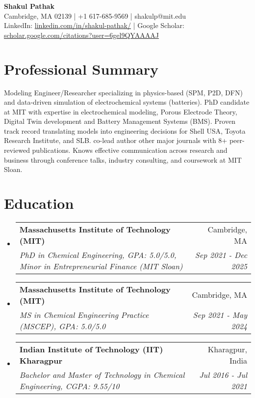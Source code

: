\documentclass[letterpaper,11pt]{article}
\makeatletter
\newcommand{\resumeSubheading}[4]{
  \vspace{-1pt}\item
    \begin{tabular*}{0.97\textwidth}{l@{\extracolsep{\fill}}r}
      \textbf{#1} & #2 \\
      \textit{\small#3} & \textit{\small #4} \\
    \end{tabular*}\vspace{-6pt}
}
\newcommand{\resumeSubHeadingListStart}{\begin{itemize}[leftmargin=*]}
\newcommand{\resumeSubHeadingListEnd}{\end{itemize}}
\makeatother
\begin{document}
\begin{center}
  \textbf{\Large Shakul Pathak} \\
  \vspace{2pt}
  Cambridge, MA 02139 | +1 617-685-9569 | shakulp@mit.edu \\
 LinkedIn: \href{https://www.linkedin.com/in/shakul-pathak/}{linkedin.com/in/shakul-pathak/} | Google Scholar:  \href{https://scholar.google.com/citations?user=6gel9QYAAAAJ}{scholar.google.com/citations?user=6gel9QYAAAAJ}
\end{center}
\vspace{-8pt}

\section{Professional Summary}
\vspace{-2pt}
Modeling Engineer/Researcher specializing in physics-based (SPM, P2D, DFN) and data-driven simulation of electrochemical systems (batteries). PhD candidate at MIT with expertise in electrochemical modeling, Porous Electrode Theory, Digital Twin development and Battery Management Systems (BMS). Proven track record translating models into engineering decisions for Shell USA, Toyota Research Institute, and SLB. co-lead author other major journals with 8+ peer-reviewed publications. Knows effective communication across research and business through conference talks, industry consulting, and coursework at MIT Sloan.

\section{Education}
  \resumeSubHeadingListStart
    \resumeSubheading
      {Massachusetts Institute of Technology (MIT)}{Cambridge, MA}
      {PhD in Chemical Engineering, GPA: 5.0/5.0, Minor in Entrepreneurial Finance (MIT Sloan)}{Sep 2021 - Dec 2025}
    \resumeSubheading
      {Massachusetts Institute of Technology (MIT)}{Cambridge, MA}
      {MS in Chemical Engineering Practice (MSCEP), GPA: 5.0/5.0}{Sep 2021 - May 2024}
    \resumeSubheading
      {Indian Institute of Technology (IIT) Kharagpur}{Kharagpur, India}
      {Bachelor and Master of Technology in Chemical Engineering, CGPA: 9.55/10}{Jul 2016 - Jul 2021}
  \resumeSubHeadingListEnd

\end{document}
